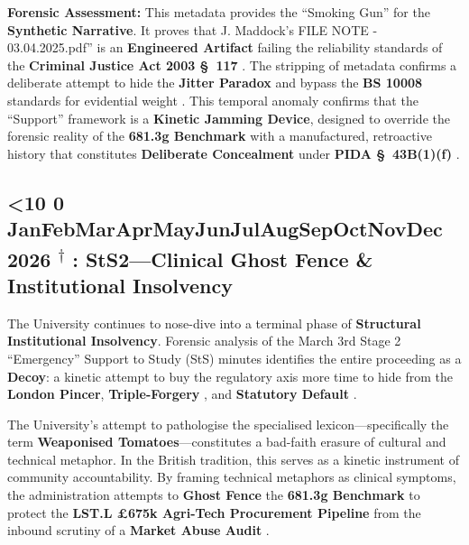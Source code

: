 \documentclass{EMBASSY}
\DeclareRobustCommand{\gmt}[3]{%
    \texorpdfstring{%
        {\color{DateGold}\textbf{%
            \ifnum#1<10 0\fi#1\,\textperiodcentered\,%
            \ifcase#2\or Jan\or Feb\or Mar\or Apr\or May\or Jun\or Jul\or Aug\or Sep\or Oct\or Nov\or Dec\fi
            \,\textperiodcentered\,20#3%
            \textsuperscript{$\dagger$}%
        }}%
    }{%
        (#1/#2/#3)%
    }%
}
\begin{document}
\textbf{Forensic Assessment:} This metadata provides the ``Smoking Gun'' for the \textbf{Synthetic Narrative}. It proves that J. Maddock’s FILE NOTE - 03.04.2025.pdf'' is an \textbf{Engineered Artifact} failing the reliability standards of the \textbf{Criminal Justice Act 2003 \S~117} \cite{CJA03}. The stripping of metadata confirms a deliberate attempt to hide the \textbf{Jitter Paradox} and bypass the \textbf{BS 10008} standards for evidential weight \cite{BSI10008}. This temporal anomaly confirms that the ``Support'' framework is a \textbf{Kinetic Jamming Device}, designed to override the forensic reality of the \textbf{681.3g Benchmark} with a manufactured, retroactive history that constitutes \textbf{Deliberate Concealment} under \textbf{PIDA \S~43B(1)(f)} \cite{PIDA98}.

\subsection{\gmt{7}{3}{26}: StS2---Clinical Ghost Fence \& Institutional Insolvency}
The University continues to nose-dive into a terminal phase of \textbf{Structural Institutional Insolvency}. Forensic analysis of the March 3rd Stage 2 ``Emergency'' Support to Study (StS) minutes identifies the entire proceeding as a \textbf{Decoy}: a kinetic attempt to buy the regulatory axis more time to hide from the \textbf{London Pincer}, \textbf{Triple-Forgery} \cite{FCA81}, and \textbf{Statutory Default} \cite{ERA88}.

The University’s attempt to pathologise the specialised lexicon---specifically the term \textbf{Weaponised Tomatoes}---constitutes a bad-faith erasure of cultural and technical metaphor. In the British tradition, this serves as a kinetic instrument of community accountability. By framing technical metaphors as clinical symptoms, the administration attempts to \textbf{Ghost Fence} the \textbf{681.3g Benchmark} to protect the \textbf{LST.L \pounds675k Agri-Tech Procurement Pipeline} from the inbound scrutiny of a \textbf{Market Abuse Audit} \cite{UKMAR}.
\end{document}
